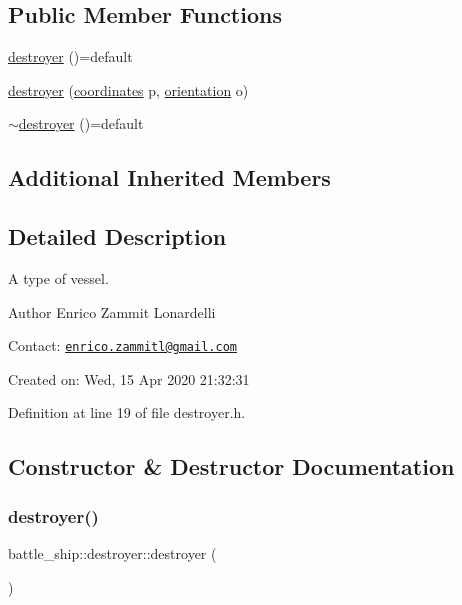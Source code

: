 \subsection*{Public Member Functions}
\begin{DoxyCompactItemize}
\item 
\hyperlink{classbattle__ship_1_1destroyer_ae26647f7b12b2dc4cc1ef6951734a08b}{destroyer} ()=default
\item 
\hyperlink{classbattle__ship_1_1destroyer_af0f630a4ecc4d6667b6adf021633da83}{destroyer} (\hyperlink{structbattle__ship_1_1coordinates}{coordinates} p, \hyperlink{namespacebattle__ship_aed87488f0a73f0d0679fe343fb61c784}{orientation} o)
\item 
\hyperlink{classbattle__ship_1_1destroyer_a6abbf5c8970c69703ae57786e2247f9a}{$\sim$destroyer} ()=default
\end{DoxyCompactItemize}
\subsection*{Additional Inherited Members}


\subsection{Detailed Description}
A type of vessel. 

\begin{DoxyAuthor}{Author}
Enrico Zammit Lonardelli
\end{DoxyAuthor}
Contact\+: \href{mailto:enrico.zammitl@gmail.com}{\tt enrico.\+zammitl@gmail.\+com}

Created on\+: Wed, 15 Apr 2020 21\+:32\+:31 

Definition at line 19 of file destroyer.\+h.



\subsection{Constructor \& Destructor Documentation}
\mbox{\label{classbattle__ship_1_1destroyer_ae26647f7b12b2dc4cc1ef6951734a08b}} 
\subsubsection{\texorpdfstring{destroyer()}{destroyer()}\hspace{0.1cm}{\footnotesize\ttfamily [1/2]}}
{\footnotesize\ttfamily battle\+\_\+ship\+::destroyer\+::destroyer (\begin{DoxyParamCaption}{ }\end{DoxyParamCaption})\hspace{0.3cm}{\ttfamily [default]}}

